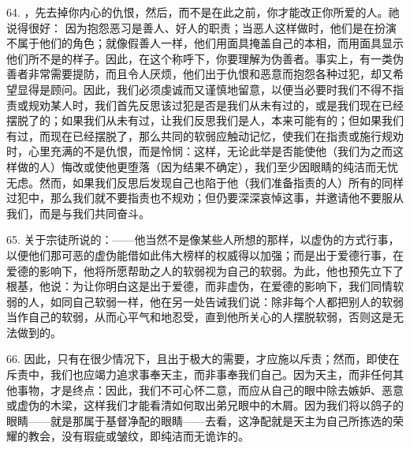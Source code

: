 64.  ，先去掉你内心的仇恨，然后，而不是在此之前，你才能改正你所爱的人。祂说得很好： 因为抱怨恶习是善人、好人的职责；当恶人这样做时，他们是在扮演不属于他们的角色；就像假善人一样，他们用面具掩盖自己的本相，而用面具显示他们所不是的样子。因此，在这个称呼下，你要理解为伪善者。事实上，有一类伪善者非常需要提防，而且令人厌烦，他们出于仇恨和恶意而抱怨各种过犯，却又希望显得是顾问。因此，我们必须虔诚而又谨慎地留意，以便当必要时我们不得不指责或规劝某人时，我们首先反思该过犯是否是我们从未有过的，或是我们现在已经摆脱了的；如果我们从未有过，让我们反思我们是人，本来可能有的；但如果我们有过，而现在已经摆脱了，那么共同的软弱应触动记忆，使我们在指责或施行规劝时，心里充满的不是仇恨，而是怜悯：这样，无论此举是否能使他（我们为之而这样做的人）悔改或使他更堕落（因为结果不确定），我们至少因眼睛的纯洁而无忧无虑。然而，如果我们反思后发现自己也陷于他（我们准备指责的人）所有的同样过犯中，那么我们就不要指责也不规劝；但仍要深深哀悼这事，并邀请他不要服从我们，而是与我们共同奋斗。\par

65. 关于宗徒所说的：——他当然不是像某些人所想的那样，以虚伪的方式行事，以便他们那可恶的虚伪能借如此伟大榜样的权威得以加强；而是出于爱德行事，在爱德的影响下，他将所愿帮助之人的软弱视为自己的软弱。为此，他也预先立下了根基，他说：为让你明白这是出于爱德，而非虚伪，在爱德的影响下，我们同情软弱的人，如同自己软弱一样，他在另一处告诫我们说：除非每个人都把别人的软弱当作自己的软弱，从而心平气和地忍受，直到他所关心的人摆脱软弱，否则这是无法做到的。\par

66. 因此，只有在很少情况下，且出于极大的需要，才应施以斥责；然而，即使在斥责中，我们也应竭力追求事奉天主，而非事奉我们自己。因为天主，而非任何其他事物，才是终点：因此，我们不可心怀二意，而应从自己的眼中除去嫉妒、恶意或虚伪的木梁，这样我们才能看清如何取出弟兄眼中的木屑。因为我们将以鸽子的眼睛——就是那属于基督净配的眼睛——去看，这净配就是天主为自己所拣选的荣耀的教会，没有瑕疵或皱纹，即纯洁而无诡诈的。\par

